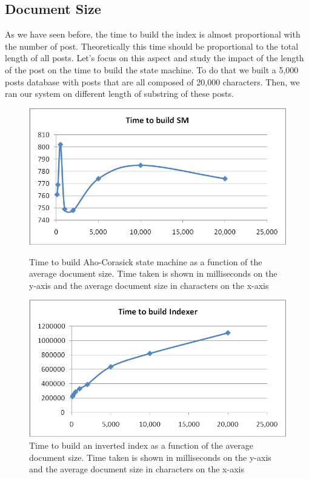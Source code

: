 \documentclass[10pt]{article}
\begin{document}
\subsection{Document Size} 
As we have seen before, the time to build the index is almost
proportional with the number of post. Theoretically this time should
be proportional to the total length of all posts. Let’s focus on this
aspect and study the impact of the length of the post on the time to
build the state machine. To do that we built a 5,000 posts database
with posts that are all composed of 20,000 characters. Then, we ran
our system on different length of substring of these posts. 


\begin{figure}[ht]
  \begin{minipage}[b]{0.5\linewidth}
    \centering
    \includegraphics[width=\textwidth]{docsizetimecomplexbuildsm}
    \caption{Time to build Aho-Corasick state machine as a function of
      the average document size. Time taken is shown in milliseconds on the
      y-axis and the average document size in characters on the x-axis}
    \label{fig:docsizetimecomplexbuildsm}
  \end{minipage}
  \hspace{0.5cm}
  \begin{minipage}[b]{0.5\linewidth}
    \centering
    \includegraphics[width=\textwidth]{docsizetimecomplexbuildindex}
    \caption{Time to build an inverted index as a function of the
      average document size. Time taken is shown in milliseconds on the
      y-axis and the average document size in characters on the x-axis} 
    \label{fig:docsizetimecomplexbuildindex}
  \end{minipage}
\end{figure}
 
\end{document}
